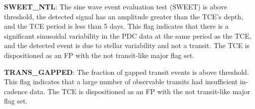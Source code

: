 \textbf{SWEET\_NTL}: The sine wave event evaluation test (SWEET) is above threshold, the detected signal has an amplitude greater than the TCE's depth, and the TCE period is less than 5 days. This flag indicates that there is a significant sinusoidal variability in the PDC data at the same period as the TCE, and the detected event is due to stellar variability and not a transit. The TCE is dispositioned as an FP with the not transit-like major flag set.

\textbf{TRANS\_GAPPED}: The fraction of gapped transit events is above threshold. This flag indicates that a large number of observable transits had insufficient in-cadence data. The TCE is dispositioned as an FP with the not transit-like major flag set.
